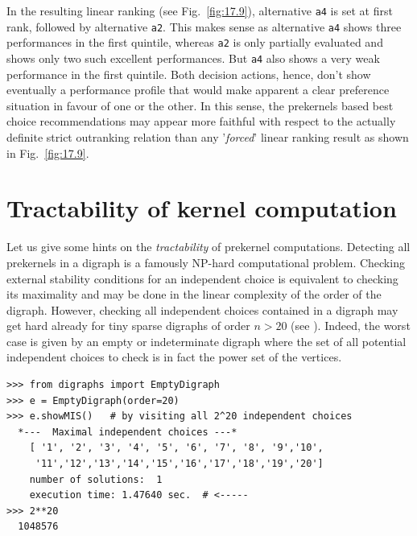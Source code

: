 In the resulting linear ranking (see Fig.~\vref{fig:17.9}), alternative \texttt{a4} is set at first rank, followed by alternative \texttt{a2}. This makes sense as alternative \texttt{a4} shows three performances in the first quintile, whereas \texttt{a2} is only partially evaluated and shows only two such excellent performances. But \texttt{a4} also shows a very weak performance in the first quintile. Both decision actions, hence, don't show eventually a performance profile that would make apparent a clear preference situation in favour of one or the other. In this sense, the prekernels based best choice recommendations may appear more faithful with respect to the actually definite strict outranking relation than any '\emph{forced}' linear ranking result as shown in Fig.~\vref{fig:17.9}.

\section{Tractability of kernel computation}
\label{sec:17.5}

Let us give some hints on the \emph{tractability} of prekernel computations. Detecting all prekernels in a digraph is a famously NP-hard computational problem. Checking external stability conditions for an independent choice is equivalent to checking its maximality and may be done in the linear complexity of the order of the digraph. However, checking all independent choices contained in a digraph may get hard already for tiny sparse digraphs of order $n > 20$ (see \citealp{BIS-2006b}). Indeed, the worst case is given by an empty or indeterminate digraph where the set of all potential independent choices to check is in fact the power set of the vertices.
\begin{lstlisting}
>>> from digraphs import EmptyDigraph
>>> e = EmptyDigraph(order=20)
>>> e.showMIS()   # by visiting all 2^20 independent choices
  *---  Maximal independent choices ---*
    [ '1', '2', '3', '4', '5', '6', '7', '8', '9','10',
     '11','12','13','14','15','16','17','18','19','20']
    number of solutions:  1
    execution time: 1.47640 sec.  # <-----
>>> 2**20
  1048576
\end{lstlisting}

